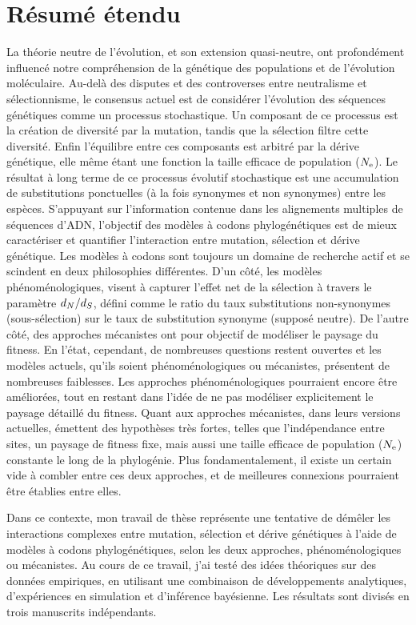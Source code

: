 \section*{Résumé étendu}

La théorie neutre de l’évolution, et son extension quasi-neutre, ont profondément influencé notre compréhension de la génétique des populations et de l'évolution moléculaire.
Au-delà des disputes et des controverses entre neutralisme et sélectionnisme, le consensus actuel est de considérer l'évolution des séquences génétiques comme un processus stochastique.
Un composant de ce processus est la création de diversité par la mutation, tandis que la sélection filtre cette diversité.
Enfin l'équilibre entre ces composants est arbitré par la dérive génétique, elle même étant une fonction la taille efficace de population ($N_{\textrm{e}}$).
Le résultat à long terme de ce processus évolutif stochastique est une accumulation de substitutions ponctuelles (à la fois synonymes et non synonymes) entre les espèces.
S'appuyant sur l'information contenue dans les alignements multiples de séquences d'ADN, l'objectif des modèles à codons phylogénétiques est de mieux caractériser et quantifier l'interaction entre mutation, sélection et dérive génétique.
Les modèles à codons sont toujours un domaine de recherche actif et se scindent en deux philosophies différentes.
D'un côté, les modèles phénoménologiques, visent à capturer l'effet net de la sélection à travers le paramètre $d_N / d_S$, défini comme le ratio du taux substitutions non-synonymes (sous-sélection) sur le taux de substitution synonyme (supposé neutre).
De l'autre côté, des approches mécanistes ont pour objectif de modéliser le paysage du fitness.
En l'état, cependant, de nombreuses questions restent ouvertes et les modèles actuels, qu'ils soient phénoménologiques ou mécanistes, présentent de nombreuses faiblesses.
Les approches phénoménologiques pourraient encore être améliorées, tout en restant dans l'idée de ne pas modéliser explicitement le paysage détaillé du fitness.
Quant aux approches mécanistes, dans leurs versions actuelles, émettent des hypothèses très fortes, telles que l'indépendance entre sites, un paysage de fitness fixe, mais aussi une taille efficace de population ($N_{\textrm{e}}$) constante le long de la phylogénie.
Plus fondamentalement, il existe un certain vide à combler entre ces deux approches, et de meilleures connexions pourraient être établies entre elles.

Dans ce contexte, mon travail de thèse représente une tentative de démêler les interactions complexes entre mutation, sélection et dérive génétiques à l'aide de modèles à codons phylogénétiques, selon les deux approches, phénoménologiques ou mécanistes.
Au cours de ce travail, j'ai testé des idées théoriques sur des données empiriques, en utilisant une combinaison de développements analytiques, d'expériences en simulation et d'inférence bayésienne.
Les résultats sont divisés en trois manuscrits indépendants.

